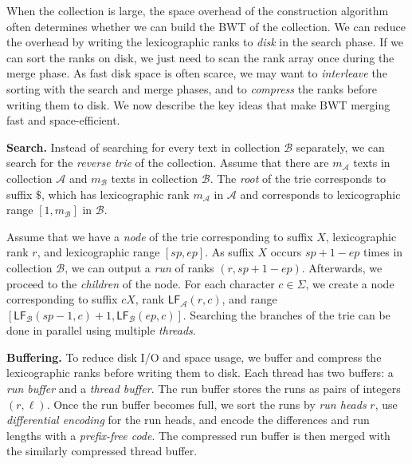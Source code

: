 \documentclass[smallabstract,smallcaptions]{dccpaper}
\newcommand{\BWT}{\textsf{BWT}}
\newcommand{\mLF}{\ensuremath{\mathsf{LF}}}
\newcommand{\Acoll}{\ensuremath{\mathcal{A}}}
\newcommand{\Bcoll}{\ensuremath{\mathcal{B}}}
\begin{document}
When the collection is large, the space overhead of the construction algorithm often determines whether we can build the \BWT{} of the collection.
%
We can reduce the overhead by writing the lexicographic ranks to \emph{disk} in the search phase. If we can sort the ranks on disk, we just need to scan the rank array once during the merge phase. As fast disk space is often scarce, we may want to \emph{interleave} the sorting with the search and merge phases, and to \emph{compress} the ranks before writing them to disk. We now describe the key ideas that make \BWT{} merging fast and space-efficient.

\smallbreak\noindent\textbf{Search.} Instead of searching for every text in collection $\Bcoll$ separately, we can search for the \emph{reverse trie} of the collection. Assume that there are $m_{\Acoll}$ texts in collection $\Acoll$ and $m_{\Bcoll}$ texts in collection $\Bcoll$. The \emph{root} of the trie corresponds to suffix $\$$, which has lexicographic rank $m_{\Acoll}$ in $\Acoll$ and corresponds to lexicographic range $[1,m_{\Bcoll}]$ in $\Bcoll$.

Assume that we have a \emph{node} of the trie corresponding to suffix $X$, lexicographic rank $r$, and lexicographic range $[sp,ep]$. As suffix $X$ occurs $sp+1-ep$ times in collection $\Bcoll$, we can output a \emph{run} of ranks $(r, sp+1-ep)$. Afterwards, we proceed to the \emph{children} of the node. For each character $c \in \Sigma$, we create a node corresponding to suffix $cX$, rank $\mLF_{\Acoll}(r,c)$, and range $[\mLF_{\Bcoll}(sp-1, c) + 1, \mLF_{\Bcoll}(ep, c)]$. Searching the branches of the trie can be done in parallel using multiple \emph{threads}.

\smallbreak\noindent\textbf{Buffering.} To reduce disk I/O and space usage, we buffer and compress the lexicographic ranks before writing them to disk. Each thread has two buffers: a \emph{run buffer} and a \emph{thread buffer}. The run buffer stores the runs as pairs of integers $(r, \ell)$. Once the run buffer becomes full, we sort the runs by \emph{run heads} $r$, use \emph{differential encoding} for the run heads, and encode the differences and run lengths with a \emph{prefix-free code}. The compressed run buffer is then merged with the similarly compressed thread buffer.
\end{document}
